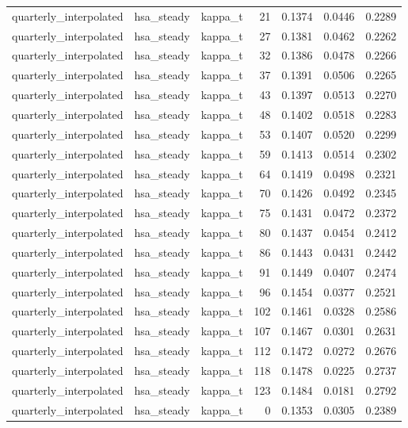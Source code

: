 \begin{tabular}{lllrrrr}
quarterly\_interpolated & hsa\_steady & kappa\_t & 21 & 0.1374 & 0.0446 & 0.2289 \\
quarterly\_interpolated & hsa\_steady & kappa\_t & 27 & 0.1381 & 0.0462 & 0.2262 \\
quarterly\_interpolated & hsa\_steady & kappa\_t & 32 & 0.1386 & 0.0478 & 0.2266 \\
quarterly\_interpolated & hsa\_steady & kappa\_t & 37 & 0.1391 & 0.0506 & 0.2265 \\
quarterly\_interpolated & hsa\_steady & kappa\_t & 43 & 0.1397 & 0.0513 & 0.2270 \\
quarterly\_interpolated & hsa\_steady & kappa\_t & 48 & 0.1402 & 0.0518 & 0.2283 \\
quarterly\_interpolated & hsa\_steady & kappa\_t & 53 & 0.1407 & 0.0520 & 0.2299 \\
quarterly\_interpolated & hsa\_steady & kappa\_t & 59 & 0.1413 & 0.0514 & 0.2302 \\
quarterly\_interpolated & hsa\_steady & kappa\_t & 64 & 0.1419 & 0.0498 & 0.2321 \\
quarterly\_interpolated & hsa\_steady & kappa\_t & 70 & 0.1426 & 0.0492 & 0.2345 \\
quarterly\_interpolated & hsa\_steady & kappa\_t & 75 & 0.1431 & 0.0472 & 0.2372 \\
quarterly\_interpolated & hsa\_steady & kappa\_t & 80 & 0.1437 & 0.0454 & 0.2412 \\
quarterly\_interpolated & hsa\_steady & kappa\_t & 86 & 0.1443 & 0.0431 & 0.2442 \\
quarterly\_interpolated & hsa\_steady & kappa\_t & 91 & 0.1449 & 0.0407 & 0.2474 \\
quarterly\_interpolated & hsa\_steady & kappa\_t & 96 & 0.1454 & 0.0377 & 0.2521 \\
quarterly\_interpolated & hsa\_steady & kappa\_t & 102 & 0.1461 & 0.0328 & 0.2586 \\
quarterly\_interpolated & hsa\_steady & kappa\_t & 107 & 0.1467 & 0.0301 & 0.2631 \\
quarterly\_interpolated & hsa\_steady & kappa\_t & 112 & 0.1472 & 0.0272 & 0.2676 \\
quarterly\_interpolated & hsa\_steady & kappa\_t & 118 & 0.1478 & 0.0225 & 0.2737 \\
quarterly\_interpolated & hsa\_steady & kappa\_t & 123 & 0.1484 & 0.0181 & 0.2792 \\
quarterly\_interpolated & hsa\_steady & kappa\_t & 0 & 0.1353 & 0.0305 & 0.2389 \\

\end{tabular}
